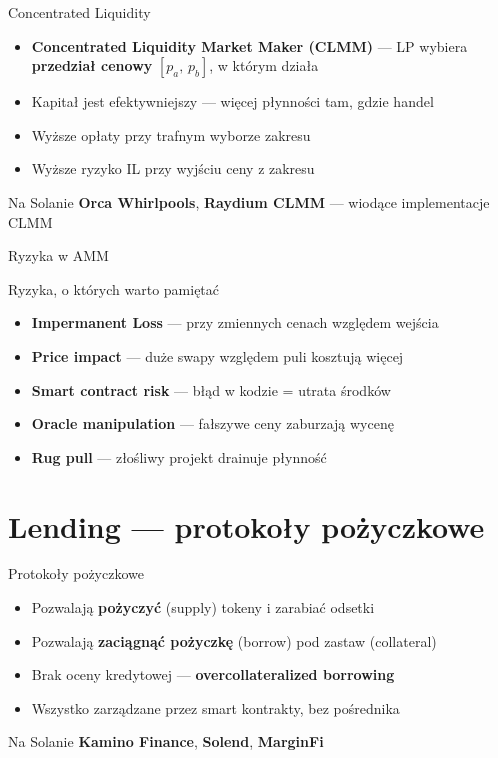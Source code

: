 \begin{frame}{Concentrated Liquidity}
  \begin{itemize}
    \item \textbf{Concentrated Liquidity Market Maker (CLMM)} --- LP wybiera \textbf{przedział cenowy} $[p_a,\, p_b]$, w którym działa
    \item Kapitał jest efektywniejszy --- więcej płynności tam, gdzie handel
    \item Wyższe opłaty przy trafnym wyborze zakresu
    \item Wyższe ryzyko IL przy wyjściu ceny z zakresu
  \end{itemize}
  \vspace{0.3cm}
  \begin{exampleblock}{Na Solanie}
    \textbf{Orca Whirlpools}, \textbf{Raydium CLMM} --- wiodące implementacje CLMM
  \end{exampleblock}
\end{frame}

\begin{frame}{Ryzyka w AMM}
  \begin{alertblock}{Ryzyka, o których warto pamiętać}
    \begin{itemize}
      \item \textbf{Impermanent Loss} --- przy zmiennych cenach względem wejścia
      \item \textbf{Price impact} --- duże swapy względem puli kosztują więcej
      \item \textbf{Smart contract risk} --- błąd w kodzie = utrata środków
      \item \textbf{Oracle manipulation} --- fałszywe ceny zaburzają wycenę
      \item \textbf{Rug pull} --- złośliwy projekt drainuje płynność
    \end{itemize}
  \end{alertblock}
\end{frame}

\section{Lending --- protokoły pożyczkowe}

\begin{frame}{Protokoły pożyczkowe}
  \begin{itemize}
    \item Pozwalają \textbf{pożyczyć} (supply) tokeny i zarabiać odsetki
    \item Pozwalają \textbf{zaciągnąć pożyczkę} (borrow) pod zastaw (collateral)
    \item Brak oceny kredytowej --- \textbf{overcollateralized borrowing}
    \item Wszystko zarządzane przez smart kontrakty, bez pośrednika
  \end{itemize}
  \vspace{0.3cm}
  \begin{exampleblock}{Na Solanie}
    \textbf{Kamino Finance}, \textbf{Solend}, \textbf{MarginFi}
  \end{exampleblock}
\end{frame}


